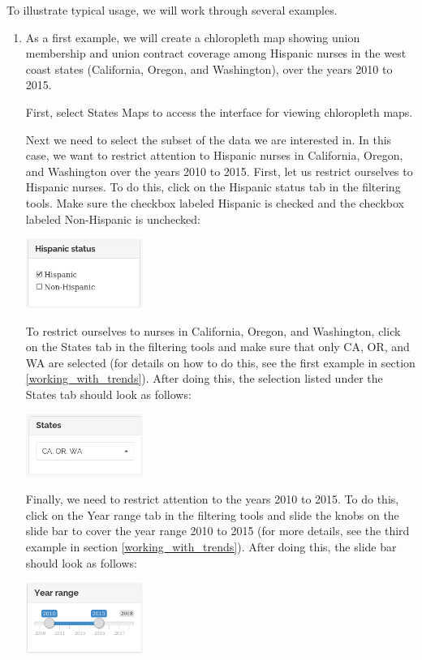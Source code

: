 \documentclass[letterpaper,12pt]{article}
\begin{document}
To illustrate typical usage, we will work through several examples.
\begin{enumerate}
\item As a first example, we will create a chloropleth map showing
  union membership and union contract coverage among Hispanic nurses
  in the west coast states (California, Oregon, and Washington), over
  the years 2010 to 2015.

  First, select States \textrightarrow{} Maps to access the interface
  for viewing chloropleth maps.

  Next we need to select the subset of the data we are interested
  in. In this case, we want to restrict attention to Hispanic nurses
  in California, Oregon, and Washington over the years 2010 to
  2015. First, let us restrict ourselves to Hispanic nurses. To do
  this, click on the Hispanic status tab in the filtering tools. Make
  sure the checkbox labeled Hispanic is checked and the checkbox
  labeled Non-Hispanic is unchecked:
  \begin{center}
    \includegraphics[width=0.3\textwidth]{images/maps_ex1/hisp_selection.png}
  \end{center}
  To restrict ourselves to nurses in California, Oregon, and
  Washington, click on the States tab in the filtering tools and make
  sure that only CA, OR, and WA are selected (for details on how to do
  this, see the first example in section
  \ref{working_with_trends}). After doing this, the selection listed
  under the States tab should look as follows:
  \begin{center}
    \includegraphics[width=0.3\textwidth]{images/maps_ex1/state_selection.png}
  \end{center}
  Finally, we need to restrict attention to the years 2010 to 2015. To
  do this, click on the Year range tab in the filtering tools and
  slide the knobs on the slide bar to cover the year range 2010 to
  2015 (for more details, see the third example in section
  \ref{working_with_trends}). After doing this, the slide bar should
  look as follows:
  \begin{center}
    \includegraphics[width=0.3\textwidth]{images/maps_ex1/year_selection.png}
  \end{center}


\end{enumerate}
\end{document}
